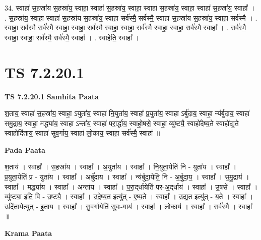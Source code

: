 \documentclass[17pt]{extarticle}
\begin{document}
34. स्वाहा॑ स॒हस्रा॑य स॒हस्रा॑य॒ स्वाहा॒ स्वाहा॑ स॒हस्रा॑य॒ स्वाहा॒ स्वाहा॑ स॒हस्रा॑य॒ स्वाहा॒ स्वाहा॑ स॒हस्रा॑य॒ स्वाहा᳚ । . स॒हस्रा॑य॒ स्वाहा॒ स्वाहा॑ स॒हस्रा॑य स॒हस्रा॑य॒ स्वाहा॒ सर्व॑स्मै॒ सर्व॑स्मै॒ स्वाहा॑ स॒हस्रा॑य स॒हस्रा॑य॒ स्वाहा॒ सर्व॑स्मै । . स्वाहा॒ सर्व॑स्मै॒ सर्व॑स्मै॒ स्वाहा॒ स्वाहा॒ सर्व॑स्मै॒ स्वाहा॒ स्वाहा॒ सर्व॑स्मै॒ स्वाहा॒ स्वाहा॒ सर्व॑स्मै॒ स्वाहा᳚ । . सर्व॑स्मै॒ स्वाहा॒ स्वाहा॒ सर्व॑स्मै॒ सर्व॑स्मै॒ स्वाहा᳚ । . स्वाहेति॒ स्वाहा᳚ । \newline
\pagebreak
{}

\section{ TS 7.2.20.1 }

\textbf{TS 7.2.20.1 } \newline
\textbf{Samhita Paata} \newline

श॒ताय॒ स्वाहा॑ स॒हस्रा॑य॒ स्वाहा॒ ऽयुता॑य॒ स्वाहा॑ नि॒युता॑य॒ स्वाहा᳚ प्र॒युता॑य॒ स्वाहा ऽर्बु॑दाय॒ स्वाहा॒ न्य॑र्बुदाय॒ स्वाहा॑ समु॒द्राय॒ स्वाहा॒ मद्ध्या॑य॒ स्वाहा ऽन्ता॑य॒ स्वाहा॑ परा॒र्द्धाय॒ स्वाहो॒षसे॒ स्वाहा॒ व्यु॑ष्ट्यै॒ स्वाहो॑देष्य॒ते स्वाहो᳚द्य॒ते स्वाहोदि॑ताय॒ स्वाहा॑ सुव॒र्गाय॒ स्वाहा॑ लो॒काय॒ स्वाहा॒ सर्व॑स्मै॒ स्वाहा᳚ ॥ \newline

\textbf{Pada Paata} \newline

श॒ताय॑ । स्वाहा᳚ । स॒हस्रा॑य । स्वाहा᳚ । अ॒युता॑य । स्वाहा᳚ । नि॒युता॒येति॑ नि - युता॑य । स्वाहा᳚ । प्र॒युता॒येति॑ प्र - युता॑य । स्वाहा᳚ । अर्बु॑दाय । स्वाहा᳚ । न्य॑र्बुदा॒येति॒ नि - अ॒र्बु॒दा॒य॒ । स्वाहा᳚ । स॒मु॒द्राय॑ । स्वाहा᳚ । मद्ध्या॑य । स्वाहा᳚ । अन्ता॑य । स्वाहा᳚ । प॒रा॒द्‌र्धायेति॑ पर-अ॒द्‌र्धाय॑ । स्वाहा᳚ । उ॒षसे᳚ । स्वाहा᳚ । व्यु॑ष्ट्या॒ इति॒ वि - उ॒ष्ट्यै॒ । स्वाहा᳚ । उ॒दे॒ष्य॒त इत्यु॑त् - ए॒ष्य॒ते । स्वाहा᳚ । उ॒द्य॒त इत्यु॑त् - य॒ते । स्वाहा᳚ । उदि॑ता॒येत्युत् - इ॒ता॒य॒ । स्वाहा᳚ । सु॒व॒र्गायेति॑ सुवः-गाय॑ । स्वाहा᳚ । लो॒काय॑ । स्वाहा᳚ । सर्व॑स्मै । स्वाहा᳚ ॥  \newline


\textbf{Krama Paata} \newline
\end{document}
